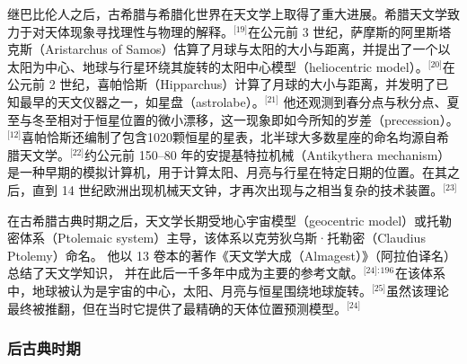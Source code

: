继巴比伦人之后，古希腊与希腊化世界在天文学上取得了重大进展。希腊天文学致力于对天体现象寻找理性与物理的解释。\(^\text{[19]}\)在公元前 3 世纪，萨摩斯的阿里斯塔克斯（Aristarchus of Samos）估算了月球与太阳的大小与距离，并提出了一个以太阳为中心、地球与行星环绕其旋转的太阳中心模型（heliocentric model）。\(^\text{[20]}\)在公元前 2 世纪，喜帕恰斯（Hipparchus）计算了月球的大小与距离，并发明了已知最早的天文仪器之一，如星盘（astrolabe）。\(^\text{[21]}\) 他还观测到春分点与秋分点、夏至与冬至相对于恒星位置的微小漂移，这一现象即如今所知的岁差（precession）。\(^\text{[12]}\)喜帕恰斯还编制了包含1020颗恒星的星表，北半球大多数星座的命名均源自希腊天文学。\(^\text{[22]}\)约公元前 150–80 年的安提基特拉机械（Antikythera mechanism）是一种早期的模拟计算机，用于计算太阳、月亮与行星在特定日期的位置。在其之后，直到 14 世纪欧洲出现机械天文钟，才再次出现与之相当复杂的技术装置。\(^\text{[23]}\)  

在古希腊古典时期之后，天文学长期受地心宇宙模型（geocentric model）或托勒密体系（Ptolemaic system）主导，该体系以克劳狄乌斯·托勒密（Claudius Ptolemy）命名。  
他以 13 卷本的著作《天文学大成（Almagest）》（阿拉伯译名）总结了天文学知识，  
并在此后一千多年中成为主要的参考文献。\(^\text{[24]: 196 }\)在该体系中，地球被认为是宇宙的中心，太阳、月亮与恒星围绕地球旋转。\(^\text{[25]}\)虽然该理论最终被推翻，但在当时它提供了最精确的天体位置预测模型。\(^\text{[24]}\)
\subsubsection{后古典时期}

